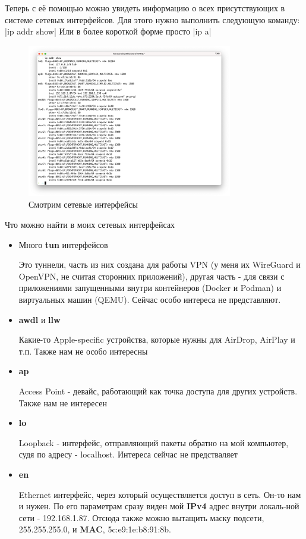 \documentclass[a4paper]{article}
\begin{document}
  Теперь с её помощью можно увидеть информацию о всех присутствующих в системе сетевых интерфейсов.
  Для этого нужно выполнить следующую команду:
  |ip addr show|
  Или в более короткой форме просто
  |ip a|
  \begin{figure}[H]
    \centering
    \includegraphics[width=0.8\textwidth]{s22}
    \caption{Смотрим сетевые интерфейсы}
  \end{figure}

  Что можно найти в моих сетевых интерфейсах
  \begin{itemize}
    \item {
      Много \textbf{tun} интерфейсов

      Это туннели, часть из них создана для работы VPN (у меня их WireGuard и OpenVPN, не считая сторонних приложений),
      другая часть - для связи с приложениями запущенными внутри контейнеров (Docker и Podman) и виртуальных машин (QEMU).
      Сейчас особо интереса не представляют.
    }
    \item {
      \textbf{awdl} и \textbf{llw}

      Какие-то Apple-specific устройства, которые нужны для AirDrop, AirPlay и т.п. Также нам не особо интересны
    }
    \item {
      \textbf{ap}

      Access Point - девайс, работающий как точка доступа для других устройств. Также нам не интересен
    }
    \item {
      \textbf{lo}

      Loopback - интерфейс, отправляющий пакеты обратно на мой компьютер, судя по адресу - localhost.
      Интереса сейчас не предстваляет
    }
    \item {
      \textbf{en}

      Ethernet интерфейс, через который осуществляется доступ в сеть. Он-то нам и нужен. По его параметрам
      сразу виден мой \textbf{IPv4} адрес внутри локаль-ной сети - 192.168.1.87. Отсюда также можно вытащить
      маску подсети, 255.255.255.0, и \textbf{MAC}, 5c:e9:1e:b8:91:8b.
    }
  \end{itemize}
\end{document}
